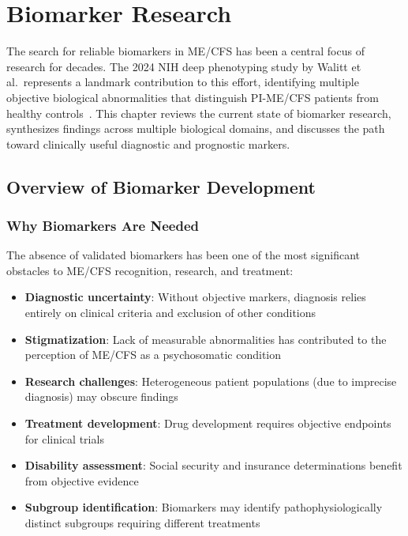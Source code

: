 \chapter{Biomarker Research}
\label{ch:biomarker-research}

The search for reliable biomarkers in ME/CFS has been a central focus of research for decades. The 2024 NIH deep phenotyping study by Walitt et al.\ represents a landmark contribution to this effort, identifying multiple objective biological abnormalities that distinguish PI-ME/CFS patients from healthy controls~\cite{walitt2024deep}. This chapter reviews the current state of biomarker research, synthesizes findings across multiple biological domains, and discusses the path toward clinically useful diagnostic and prognostic markers.

\section{Overview of Biomarker Development}
\label{sec:biomarker-overview}

\subsection{Why Biomarkers Are Needed}

The absence of validated biomarkers has been one of the most significant obstacles to ME/CFS recognition, research, and treatment:

\begin{itemize}
    \item \textbf{Diagnostic uncertainty}: Without objective markers, diagnosis relies entirely on clinical criteria and exclusion of other conditions
    \item \textbf{Stigmatization}: Lack of measurable abnormalities has contributed to the perception of ME/CFS as a psychosomatic condition
    \item \textbf{Research challenges}: Heterogeneous patient populations (due to imprecise diagnosis) may obscure findings
    \item \textbf{Treatment development}: Drug development requires objective endpoints for clinical trials
    \item \textbf{Disability assessment}: Social security and insurance determinations benefit from objective evidence
    \item \textbf{Subgroup identification}: Biomarkers may identify pathophysiologically distinct subgroups requiring different treatments
\end{itemize}

